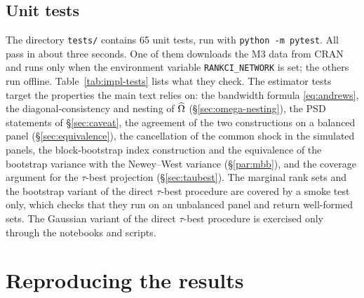 \begin{appendix}
\tabImplEnv

\subsection{Unit tests}
\label{app:impl-tests}

The directory \texttt{tests/} contains 65 unit tests, run with
\texttt{python -m pytest}. All pass in about three seconds. One of them
downloads the M3 data from CRAN and runs only when the environment variable
\texttt{RANKCI\_NETWORK} is set; the others run offline.
Table~\ref{tab:impl-tests} lists what they check. The estimator tests target the
properties the main text relies on: the bandwidth formula \eqref{eq:andrews}, the
diagonal-consistency and nesting of $\widehat{\Omega}$ (\S\ref{sec:omega-nesting}), the PSD
statements of \S\ref{sec:caveat}, the agreement of the two constructions on a balanced
panel (\S\ref{sec:equivalence}), the cancellation of the common shock in the
simulated panels, the block-bootstrap index construction and the equivalence of the
bootstrap variance with the Newey--West variance (\S\ref{par:mbb}), and the coverage
argument for the $\tau$-best projection (\S\ref{sec:taubest}). The marginal rank sets and
the bootstrap variant of the direct $\tau$-best procedure are covered by a smoke test
only, which checks that they run on an unbalanced panel and return well-formed sets. The
Gaussian variant of the direct $\tau$-best procedure is exercised only through the
notebooks and scripts.

\tabImplTests

\section{Reproducing the results}
\label{app:impl-repro}


\end{appendix}

